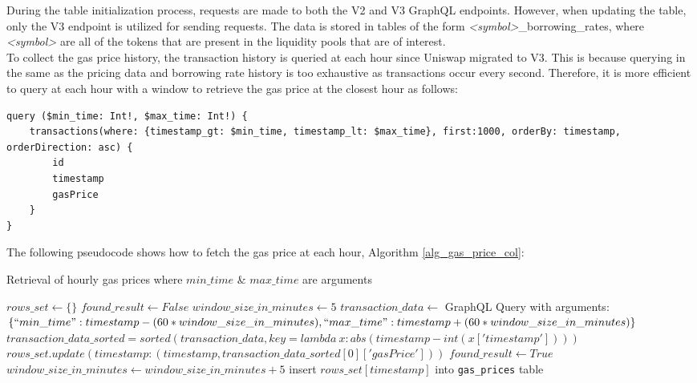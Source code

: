 During the table initialization process, requests are made to both the V2 and V3 GraphQL endpoints. However, when updating the table, only the V3 endpoint is utilized for sending requests. The data is stored in tables of the form \textit{<symbol>}\_borrowing\_rates, where \textit{<symbol>} are all of the tokens that are present in the liquidity pools that are of interest.
\\[5mm]
To collect the gas price history, the transaction history is queried at each hour since Uniswap migrated to V3. This is because querying in the same as the pricing data and borrowing rate history is too exhaustive as transactions occur every second. Therefore, it is more efficient to query at each hour with a window to retrieve the gas price at the closest hour as follows:
\vspace{5mm}
\begin{lstlisting}
query ($min_time: Int!, $max_time: Int!) {
    transactions(where: {timestamp_gt: $min_time, timestamp_lt: $max_time}, first:1000, orderBy: timestamp, orderDirection: asc) {
        id
        timestamp
        gasPrice
    }
}
\end{lstlisting}
\vspace{5mm}
The following pseudocode shows how to fetch the gas price at each hour, Algorithm \ref{alg_gas_price_col}:

\begin{algorithm}
    \caption{Retrieval of hourly gas prices where $min\_time$ \& $max\_time$ are arguments}\label{alg_gas_price_col}
    \begin{algorithmic}
        \State $rows\_set \leftarrow \{\}$
            \State $found\_result \leftarrow False$
            \State $window\_size\_in\_minutes \leftarrow 5$
                \State $transaction\_data \leftarrow$ GraphQL Query with arguments: $\{``min\_time": timestamp - (60 * window\_size\_in\_minutes), ``max\_time": timestamp + (60 * window\_size\_in\_minutes)\}$
                    \State $transaction\_data\_sorted = sorted(transaction\_data, key=lambda\ x:abs(timestamp - int(x['timestamp'])))$
                    \State $rows\_set.update({timestamp: (timestamp, transaction\_data\_sorted[0]['gasPrice'])})$
                    \State $found\_result \leftarrow True$
                \Else
                    \State $window\_size\_in\_minutes \leftarrow window\_size\_in\_minutes + 5$
                \EndIf
            \EndWhile
            \State insert $rows\_set[timestamp]$ into \texttt{gas\_prices} table
        \EndFor
    \end{algorithmic}
\end{algorithm}

